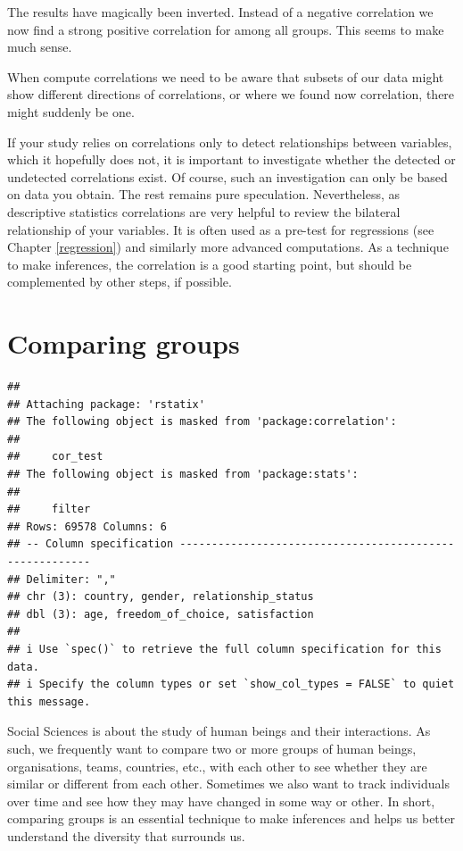 \documentclass[
]{book}
\begin{document}
The results have magically been inverted. Instead of a negative correlation we now find a strong positive correlation for among all groups. This seems to make much sense.

When compute correlations we need to be aware that subsets of our data might show different directions of correlations, or where we found now correlation, there might suddenly be one.

If your study relies on correlations only to detect relationships between variables, which it hopefully does not, it is important to investigate whether the detected or undetected correlations exist. Of course, such an investigation can only be based on data you obtain. The rest remains pure speculation. Nevertheless, as descriptive statistics correlations are very helpful to review the bilateral relationship of your variables. It is often used as a pre-test for regressions (see Chapter \ref{regression}) and similarly more advanced computations. As a technique to make inferences, the correlation is a good starting point, but should be complemented by other steps, if possible.

\hypertarget{comparing-groups}{%
\chapter{Comparing groups}\label{comparing-groups}}

\begin{verbatim}
## 
## Attaching package: 'rstatix'
## The following object is masked from 'package:correlation':
## 
##     cor_test
## The following object is masked from 'package:stats':
## 
##     filter
## Rows: 69578 Columns: 6
## -- Column specification --------------------------------------------------------
## Delimiter: ","
## chr (3): country, gender, relationship_status
## dbl (3): age, freedom_of_choice, satisfaction
## 
## i Use `spec()` to retrieve the full column specification for this data.
## i Specify the column types or set `show_col_types = FALSE` to quiet this message.
\end{verbatim}

Social Sciences is about the study of human beings and their interactions. As such, we frequently want to compare two or more groups of human beings, organisations, teams, countries, etc., with each other to see whether they are similar or different from each other. Sometimes we also want to track individuals over time and see how they may have changed in some way or other. In short, comparing groups is an essential technique to make inferences and helps us better understand the diversity that surrounds us.
\end{document}

